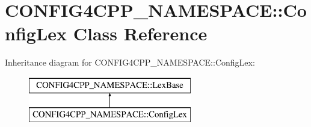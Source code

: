 \hypertarget{classCONFIG4CPP__NAMESPACE_1_1ConfigLex}{\section{C\-O\-N\-F\-I\-G4\-C\-P\-P\-\_\-\-N\-A\-M\-E\-S\-P\-A\-C\-E\-:\-:Config\-Lex Class Reference}
\label{classCONFIG4CPP__NAMESPACE_1_1ConfigLex}
}
Inheritance diagram for C\-O\-N\-F\-I\-G4\-C\-P\-P\-\_\-\-N\-A\-M\-E\-S\-P\-A\-C\-E\-:\-:Config\-Lex\-:\begin{figure}[H]
\begin{center}
\leavevmode
\includegraphics[height=2.000000cm]{classCONFIG4CPP__NAMESPACE_1_1ConfigLex}
\end{center}
\end{figure}
